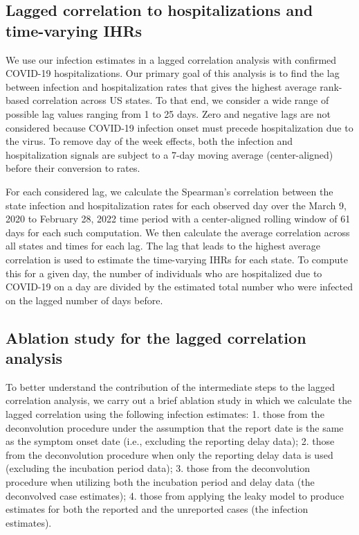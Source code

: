 \documentclass{article}
\begin{document}
\subsection{Lagged correlation to hospitalizations and time-varying IHRs} 

We use our infection estimates in a lagged correlation analysis with
confirmed COVID-19 hospitalizations. Our primary goal of this analysis is to
find the lag between infection and hospitalization rates that gives the highest
average rank-based correlation across US states. To that end, we consider a wide
range of possible lag values ranging from 1 to 25 days. Zero and negative
lags are not considered because COVID-19 infection onset must precede
hospitalization due to the virus. To remove day of the week effects, both the
infection and hospitalization signals are subject to a 7-day moving
average (center-aligned) before their conversion to rates.

For each considered lag, we calculate the Spearman's correlation between the 
state infection and hospitalization rates for each observed day 
over the March 9, 2020 to February 28, 2022
time period %
with a center-aligned rolling window of 61 days for each such computation.
We then calculate the average correlation across all states and times for each lag. 
The lag that leads to the highest average correlation is used to estimate 
the time-varying IHRs for each
state. To compute this for a given day, the number of individuals who are
hospitalized due to COVID-19 on a day are divided by the estimated total number
who were infected on the lagged number of days before.

\subsection{Ablation study for the lagged correlation analysis} 

To better understand the contribution of the intermediate steps to the lagged 
correlation analysis, we carry out a brief ablation study in which we calculate the 
lagged correlation using the following infection estimates: 1. those from the
deconvolution procedure under the assumption that the report date is the 
same as the symptom onset date (i.e., excluding
the reporting delay data); 2. those from the deconvolution procedure when only the
reporting delay data is used (excluding the incubation period data); 3. those from
the deconvolution procedure when utilizing both the incubation period and delay data 
(the deconvolved case estimates); 4. those from applying the leaky model to produce
estimates for both the reported and the unreported cases (the infection estimates).
\end{document}
